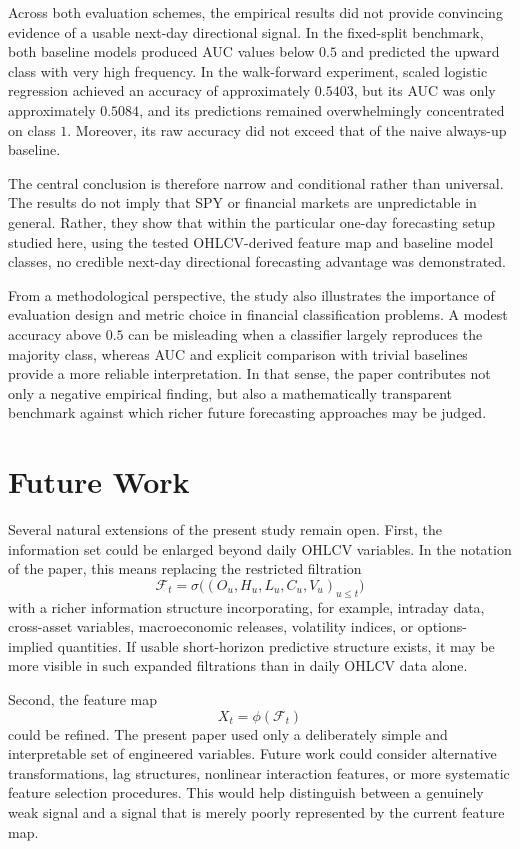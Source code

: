 \documentclass[11pt,a4paper]{article}
\begin{document}
	Across both evaluation schemes, the empirical results did not provide convincing evidence of a usable next-day directional signal. In the fixed-split benchmark, both baseline models produced AUC values below \(0.5\) and predicted the upward class with very high frequency. In the walk-forward experiment, scaled logistic regression achieved an accuracy of approximately \(0.5403\), but its AUC was only approximately \(0.5084\), and its predictions remained overwhelmingly concentrated on class \(1\). Moreover, its raw accuracy did not exceed that of the naive always-up baseline.
	
	The central conclusion is therefore narrow and conditional rather than universal. The results do not imply that SPY or financial markets are unpredictable in general. Rather, they show that within the particular one-day forecasting setup studied here, using the tested OHLCV-derived feature map and baseline model classes, no credible next-day directional forecasting advantage was demonstrated.
	
	From a methodological perspective, the study also illustrates the importance of evaluation design and metric choice in financial classification problems. A modest accuracy above \(0.5\) can be misleading when a classifier largely reproduces the majority class, whereas AUC and explicit comparison with trivial baselines provide a more reliable interpretation. In that sense, the paper contributes not only a negative empirical finding, but also a mathematically transparent benchmark against which richer future forecasting approaches may be judged.
	
	\section{Future Work}
	
	Several natural extensions of the present study remain open. First, the information set could be enlarged beyond daily OHLCV variables. In the notation of the paper, this means replacing the restricted filtration
	\[
	\mathcal{F}_t = \sigma\!\big((O_u,H_u,L_u,C_u,V_u)_{u\le t}\big)
	\]
	with a richer information structure incorporating, for example, intraday data, cross-asset variables, macroeconomic releases, volatility indices, or options-implied quantities. If usable short-horizon predictive structure exists, it may be more visible in such expanded filtrations than in daily OHLCV data alone.
	
	Second, the feature map
	\[
	X_t = \phi(\mathcal{F}_t)
	\]
	could be refined. The present paper used only a deliberately simple and interpretable set of engineered variables. Future work could consider alternative transformations, lag structures, nonlinear interaction features, or more systematic feature selection procedures. This would help distinguish between a genuinely weak signal and a signal that is merely poorly represented by the current feature map.
	
\end{document}
